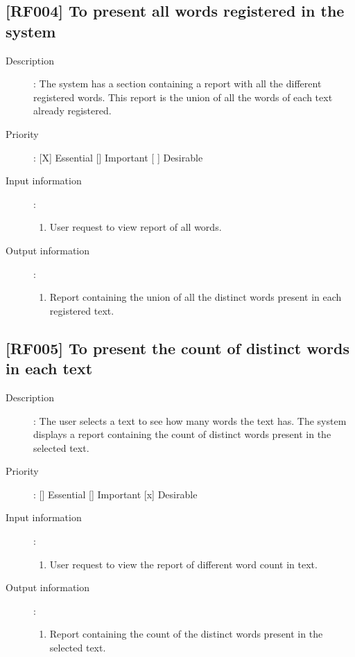 \documentclass[11pt, twoside, a4paper]{book}
\begin{document}
			\subsection{[RF004] To present all words registered in the system}
				
				\begin{description}
				
					\item[Description]: The system has a section containing a report with all the different registered words. This report is the union of all the words of each text already registered.
					\item[Priority]: [X] Essential [] Important [ ] Desirable
					\item[Input information]:
						\begin{enumerate}

							\item User request to view report of all words.
							
						\end{enumerate}
					\item[Output information]:
						\begin{enumerate}
						
							\item Report containing the union of all the distinct words present in each registered text.
																					
						\end{enumerate}
	
				\end{description}
		
			\subsection{[RF005] To present the count of distinct words in each text}
				
				\begin{description}
				
					\item[Description]: The user selects a text to see how many words the text has. The system displays a report containing the count of distinct words present in the selected text.
					\item[Priority]: [] Essential [] Important [x] Desirable
					\item[Input information]:
						\begin{enumerate}

							\item User request to view the report of different word count in text.
							
						\end{enumerate}
					\item[Output information]:
						\begin{enumerate}
						
							\item Report containing the count of the distinct words present in the selected text.
																					
						\end{enumerate}
	
				\end{description}
\end{document}
